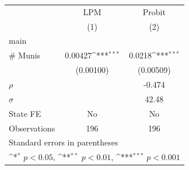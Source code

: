 {
\def\sym#1{\ifmmode^{#1}\else\(^{#1}\)\fi}
\begin{tabular}{l*{2}{c}}
\toprule
                    &\multicolumn{1}{c}{LPM}&\multicolumn{1}{c}{Probit}\\
                    &\multicolumn{1}{c}{(1)}         &\multicolumn{1}{c}{(2)}         \\
\midrule
main                &                     &                     \\
\# Munis            &     0.00427\sym{***}&      0.0218\sym{***}\\
                    &   (0.00100)         &   (0.00509)         \\
\midrule
\(\rho\)            &                     &      -0.474         \\
\(\sigma\)          &                     &       42.48         \\
State FE            &          No         &          No         \\
Observations        &         196         &         196         \\
\bottomrule
\multicolumn{3}{l}{\footnotesize Standard errors in parentheses}\\
\multicolumn{3}{l}{\footnotesize \sym{*} \(p<0.05\), \sym{**} \(p<0.01\), \sym{***} \(p<0.001\)}\\
\end{tabular}
}
